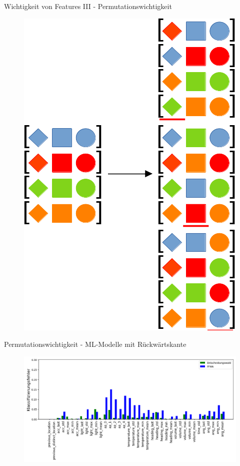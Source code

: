 \documentclass[10pt]{beamer}
\begin{document}
\begin{frame}{Wichtigkeit von Features III - Permutationswichtigkeit}
    \begin{figure}
        \centering
        \includegraphics[width=0.46\linewidth]{model/permutatation_importance.png}
    \end{figure}
\end{frame}

\begin{frame}{Permutationswichtigkeit - ML-Modelle mit Rückwärtskante}
    \begin{figure}
        \centering
        \includegraphics[width=\linewidth]{location_recognition/fi_consolidated.png}
    \end{figure}
\end{frame}
\end{document}
